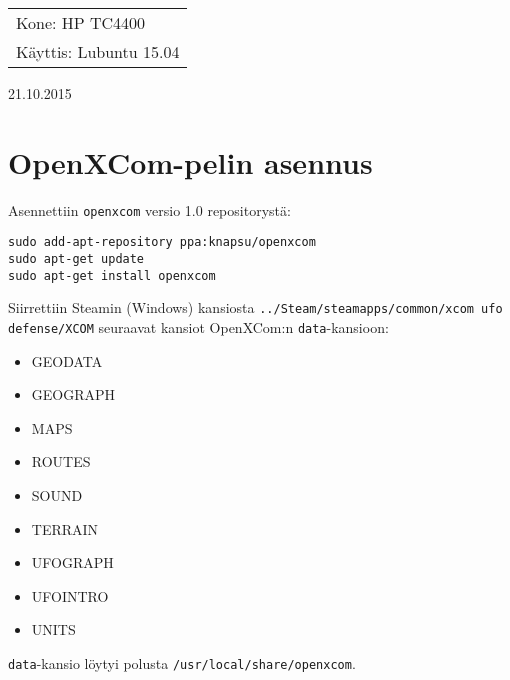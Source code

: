 \documentclass[main.tex]{subfiles}
\begin{document}
\thispagestyle{empty}
\begin{tabular}[t]{l}
Kone: HP TC4400\\
Käyttis: Lubuntu 15.04
\end{tabular}
\hfill 21.10.2015

{\section{OpenXCom-pelin asennus}}


Asennettiin \texttt{openxcom} versio 1.0 repositorystä:

\begin{lstlisting}
sudo add-apt-repository ppa:knapsu/openxcom
sudo apt-get update
sudo apt-get install openxcom
\end{lstlisting}

 Siirrettiin Steamin (Windows) kansiosta \texttt{../Steam/steamapps/common/xcom ufo defense/XCOM} seuraavat kansiot OpenXCom:n \texttt{data}-kansioon:
\begin{itemize}
\item GEODATA
\item GEOGRAPH
\item MAPS
\item ROUTES
\item SOUND
\item TERRAIN
\item UFOGRAPH
\item UFOINTRO
\item UNITS
\end{itemize}
\texttt{data}-kansio löytyi polusta \texttt{/usr/local/share/openxcom}.
\end{document}
